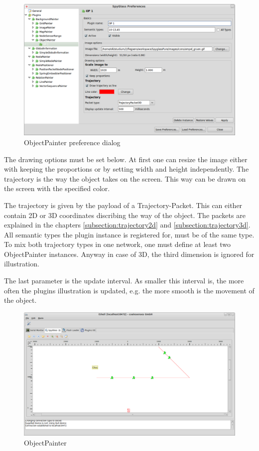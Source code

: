 \begin{figure}[htb]
  \begin{center}
    \includegraphics[width=13.2cm]{./pics/objectpainter_prefpage}
    \caption{ObjectPainter preference dialog}
    \label{pic:op_preferences}
  \end{center}
\end{figure}

The drawing options must be set below. At first one can resize the image either with keeping the proportions or by
setting width and height independently. The trajectory is the way the object takes on the screen. This way
can be drawn on the screen with the specified color.

The trajectory is given by the payload of a Trajectory-Packet. This can either contain 2D or 3D coordinates discribing
the way of the object. The packets are explained in the chapters \ref{subsection:trajectory2d} and
\ref{subsection:trajectory3d}. All semantic types the plugin instance is registered for, must be of the same type.
To mix both trajectory types in one network, one must define at least two ObjectPainter instances. Anyway in case of
3D, the third dimension is ignored for illustration.

The last parameter is the update interval. As smaller this interval is, the more
often the plugins illustration is updated, e.g. the more smooth is the movement of the object.

\begin{figure}[htb]
  \begin{center}
    \includegraphics[width=13.2cm]{./pics/objectpainter}
    \caption{ObjectPainter}
    \label{pic:op}
  \end{center}
\end{figure}

